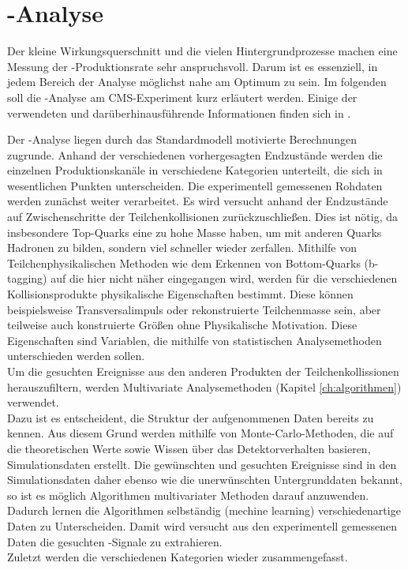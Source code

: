\section{\ttH-Analyse}
\label{ch:Experiment:sec:ttH}

Der kleine Wirkungsquerschnitt und die vielen Hintergrundprozesse machen eine Messung der \ttH-Produktionsrate sehr anspruchsvoll. Darum ist es essenziell, in jedem Bereich der Analyse m\"oglichst nahe am Optimum zu sein. Im folgenden soll die \ttH-Analyse am CMS-Experiment kurz erl\"autert werden. Einige der verwendeten und dar\"uberhinausf\"uhrende Informationen finden sich in \cite{Khachatryan:2014qaa}.

Der \ttH-Analyse liegen durch das Standardmodell motivierte Berechnungen zugrunde. Anhand der verschiedenen vorhergesagten Endzust\"ande werden die einzelnen Produktionskan\"ale in verschiedene Kategorien unterteilt, die sich in wesentlichen Punkten unterscheiden. Die experimentell gemessenen Rohdaten werden zun\"achst weiter verarbeitet. Es wird versucht anhand der Endzust\"ande auf Zwischenschritte der Teilchenkollisionen zur\"uckzuschlie\ss en. Dies ist n\"otig, da insbesondere Top-Quarks eine zu hohe Masse haben, um mit anderen Quarks Hadronen zu bilden, sondern viel schneller wieder zerfallen. Mithilfe von Teilchenphysikalischen Methoden wie dem Erkennen von Bottom-Quarks (b-tagging) auf die hier nicht n\"aher eingegangen wird, werden f\"ur die verschiedenen Kollisionsprodukte physikalische Eigenschaften bestimmt. Diese k\"onnen beispielsweise Transversalimpuls oder rekonstruierte Teilchenmasse sein, aber teilweise auch konstruierte Gr\"o\ss en ohne Physikalische Motivation. Diese Eigenschaften sind Variablen, die mithilfe von statistischen Analysemethoden unterschieden werden sollen.\\
Um die gesuchten Ereignisse aus den anderen Produkten der Teilchenkollissionen herauszufiltern, werden Multivariate Analysemethoden (Kapitel \ref{ch:algorithmen}) verwendet.\\
Dazu ist es entscheident, die Struktur der aufgenommenen Daten bereits zu kennen. Aus diesem Grund werden mithilfe von Monte-Carlo-Methoden, die auf die theoretischen Werte sowie Wissen \"uber das Detektorverhalten basieren, Simulationsdaten erstellt. Die gew\"unschten und gesuchten Ereignisse sind in den Simulationsdaten daher ebenso wie die unerw\"unschten Untergrunddaten bekannt, so ist es m\"oglich Algorithmen multivariater Methoden darauf anzuwenden. Dadurch lernen die Algorithmen selbst\"andig (mechine learning) verschiedenartige Daten zu Unterscheiden. Damit wird versucht aus den experimentell gemessenen Daten die gesuchten \ttH-Signale zu extrahieren.\\
Zuletzt werden die verschiedenen Kategorien wieder zusammengefasst.
